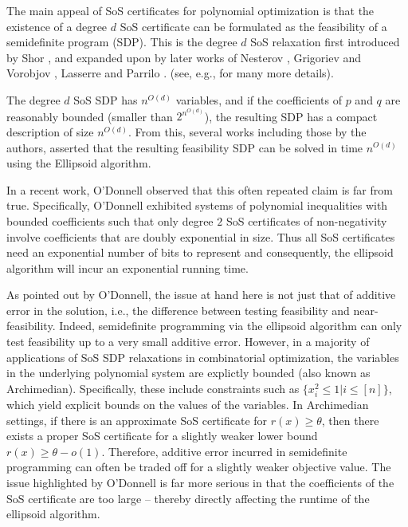 The main appeal of SoS certificates for polynomial optimization is that the existence of a degree $d$ SoS certificate can be formulated as the feasibility of a semidefinite program (SDP).
%
This is the degree $d$ SoS relaxation first introduced by Shor \cite{shor1987class}, and expanded upon by later works of Nesterov \cite{nesterov2000squared}, Grigoriev and Vorobjov \cite{grigoriev2001complexity}, Lasserre \cite{lasserre2000optimisation,lasserre2001global}  and Parrilo \cite{parrilo2000structured}.
(see, e.g., \cite{laurent2009sums,} for many more details).


The degree $d$ SoS SDP has $n^{O(d)}$ variables, and if the coefficients of $p$ and $q$ are reasonably bounded (smaller than $2^{n^{O(d)}}$), the resulting SDP has a compact description of size $n^{O(d)}$.
%
From this, several works including those by the authors, asserted that the resulting feasibility SDP can be solved in time $n^{O(d)}$ using the Ellipsoid algorithm.

In a recent work, O'Donnell \cite{odonnell17} observed that this often repeated claim is far from true.
%
Specifically, O'Donnell exhibited systems of polynomial inequalities with bounded coefficients such that only degree $2$ SoS certificates of non-negativity involve coefficients that are doubly exponential in size.
%
Thus all SoS certificates need an exponential number of bits to represent and consequently, the ellipsoid algorithm will incur an exponential running time.
%
 
As pointed out by O'Donnell, the issue at hand here is not just that of additive error in the solution, i.e., the difference between testing feasibility and near-feasibility.  
%
Indeed, semidefinite programming via the ellipsoid algorithm can only test feasibility up to a very small additive error.
%
However, in a majority of applications of SoS SDP relaxations in combinatorial optimization, the variables in the underlying polynomial system are explictly bounded (also known as Archimedian).
%
Specifically, these include constraints such as $\{ x_i^2 \leq 1 | i \leq [n]\}$, which yield explicit bounds on the values of the variables.
%
In Archimedian settings, if there is an approximate SoS certificate for $r(x) \geq \theta$, then there exists a proper SoS certificate for a slightly weaker lower bound $r(x) \geq \theta - o(1)$.
%
Therefore, additive error incurred in semidefinite programming can often be traded off for a slightly weaker objective value.
%
The issue highlighted by O'Donnell is far more serious in that the coefficients of the SoS certificate are too large -- thereby directly affecting the runtime of the ellipsoid algorithm.

